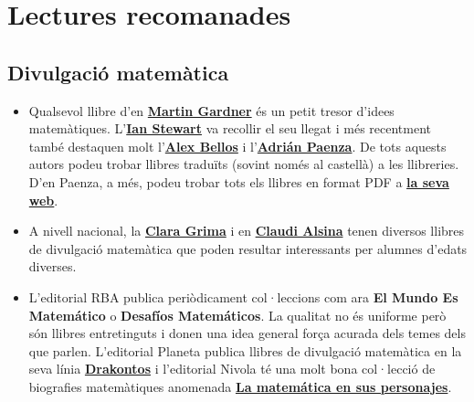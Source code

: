 \documentclass[a4paper, 12pt]{article}
\begin{document}
    \newpage %

    \section*{Lectures recomanades}

        \subsection*{Divulgació matemàtica}

            \begin{itemize}
                \item Qualsevol llibre d'en \href{https://ca.wikipedia.org/wiki/Martin_Gardner}{\textbf{Martin Gardner}} és un petit tresor d'idees matemàtiques. L'\href{https://ca.wikipedia.org/wiki/Ian_Stewart_(matem\%C3\%A0tic)}{\textbf{Ian Stewart}} va recollir el seu llegat i més recentment també destaquen molt l'\href{https://en.wikipedia.org/wiki/Alex_Bellos}{\textbf{Alex Bellos}} i l'\href{https://es.wikipedia.org/wiki/Adri\%C3\%A1n_Paenza}{\textbf{Adrián Paenza}}. De tots aquests autors podeu trobar llibres traduïts (sovint només al castellà) a les llibreries. D'en Paenza, a més, podeu trobar tots els llibres en format PDF a \href{http://cms.dm.uba.ar/material/paenza}{\textbf{la seva web}}.
                \item A nivell nacional, la \href{https://ca.wikipedia.org/wiki/Clara_Grima_Ruiz}{\textbf{Clara Grima}} i en \href{http://claudialsina.com/ca/publicacions}{\textbf{Claudi Alsina}} tenen diversos llibres de divulgació matemàtica que poden resultar interessants per alumnes d'edats diverses.
                \item L'editorial RBA publica periòdicament col·leccions com ara \textbf{El Mundo Es Matemático} o \textbf{Desafíos Matemáticos}. La qualitat no és uniforme però són llibres entretinguts i donen una idea general força acurada dels temes dels que parlen. L'editorial Planeta publica llibres de divulgació matemàtica en la seva línia \href{https://www.planetadelibros.com/coleccion-drakontos/0000965600}{\textbf{Drakontos}} i l'editorial Nivola té una molt bona col·lecció de biografies matemàtiques anomenada \href{https://www.nivola.com/listado_libros.php?idcol=2&nombre=4\%20-\%20La\%20matem\%E1tica\%20en\%20sus\%20personajes\%20-\%20Biograf\%EDas\%20de\%20los\%20grandes\%20matem\%E1ticos}{\textbf{La matemática en sus personajes}}.
            \end{itemize}
\end{document}
